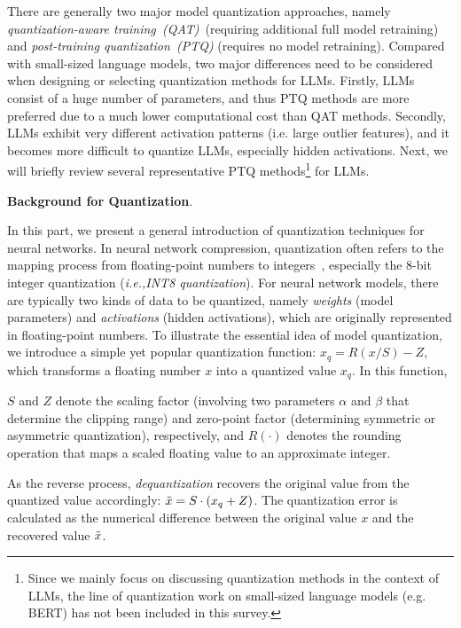 There are generally two major model quantization approaches, namely \emph{quantization-aware training~(QAT)}~(requiring additional full model retraining) and \emph{post-training quantization~(PTQ)} (requires no model retraining). Compared with small-sized language models, two major differences need to be considered when designing or selecting quantization methods for LLMs. Firstly, LLMs consist of a huge number of parameters, and thus PTQ methods are more preferred due to a much lower computational cost than QAT methods. Secondly, LLMs exhibit very different activation patterns (i.e. large outlier features), and it becomes more  difficult to quantize LLMs, especially  hidden activations. Next, we will briefly review several representative PTQ  methods\footnote{Since we mainly focus on discussing  quantization methods in the context of LLMs,  the line of  quantization work on small-sized language models (e.g. BERT) has not been included in this survey. 

} for LLMs.   

\textbf{Background for Quantization}.

In this part,  we present a general introduction of quantization techniques for neural networks. In neural network compression, quantization often refers to the mapping process from  floating-point numbers to  integers~\cite{Gholami-CoRR-2022-A}, especially the 8-bit integer quantization (\emph{i.e.,}\emph{INT8 quantization}). For neural network models, there are typically two kinds of data to be quantized, namely \emph{weights} (model parameters) and \emph{activations} (hidden activations), which are originally represented in floating-point numbers.  To illustrate the essential idea of model quantization,  we   introduce a simple yet popular quantization function: $x_q = R(x/S) - Z$, which transforms a floating number $x$ into a quantized value $x_q$. In this function, 

$S$ and $Z$ denote the scaling factor (involving two  parameters $\alpha$ and $\beta$ that determine the clipping range) and zero-point factor (determining symmetric or asymmetric quantization),  respectively, and $R(\cdot)$ denotes the rounding operation that maps a scaled floating value to an approximate integer. 

As the reverse process,  \emph{dequantization}  recovers the original value from the quantized value accordingly: $\Tilde{x} = S\cdot (x_q + Z)$.  The  quantization error is calculated as the numerical difference between the original value $x$ and the recovered value $\Tilde{x}$.  


